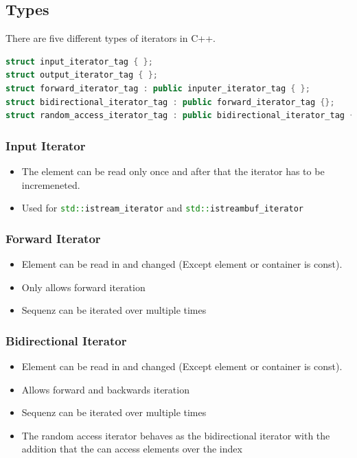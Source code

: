 \subsection{Types}
There are five different types of iterators in C++.

\begin{lstlisting}[language=C++]
struct input_iterator_tag { };
struct output_iterator_tag { };
struct forward_iterator_tag : public inputer_iterator_tag { };
struct bidirectional_iterator_tag : public forward_iterator_tag {};
struct random_access_iterator_tag : public bidirectional_iterator_tag { };
\end{lstlisting}

\subsubsection{Input Iterator}
\begin{itemize}
  \itemsep -0.5em 
  \item The element can be read only once and after that the iterator has to be incremeneted.
  \item Used for \lstinline[language=C++]|std::istream_iterator| and \lstinline[language=C++]|std::istreambuf_iterator|
\end{itemize}

\subsubsection{Forward Iterator}
\begin{itemize}
  \itemsep -0.5em 
  \item Element can be read in and changed (Except element or container is const).
  \item Only allows forward iteration
  \item Sequenz can be iterated over multiple times
\end{itemize}

\subsubsection{Bidirectional Iterator}
\begin{itemize}
  \itemsep -0.5em 
  \item Element can be read in and changed (Except element or container is const).
  \item Allows forward and backwards iteration
  \item Sequenz can be iterated over multiple times
  \item The random access iterator behaves as the bidirectional iterator with the addition that the can access elements over the index
\end{itemize}

